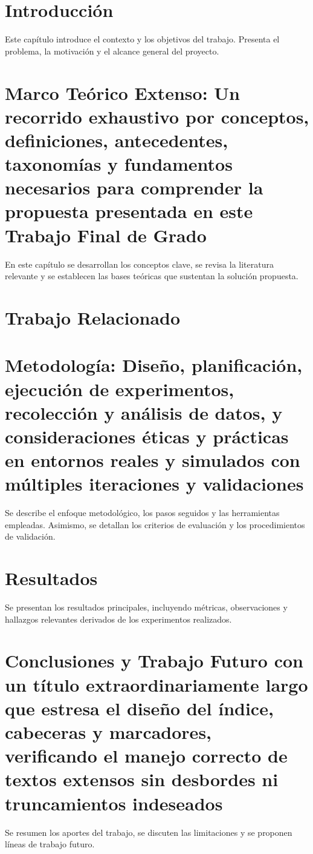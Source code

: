 
\chapter{Introducción}
Este capítulo introduce el contexto y los objetivos del trabajo. Presenta el problema, la motivación y el alcance general del proyecto.

\chapter[Marco Teórico]{Marco Teórico Extenso: Un recorrido exhaustivo por conceptos, definiciones, antecedentes, taxonomías y fundamentos necesarios para comprender la propuesta presentada en este Trabajo Final de Grado}
En este capítulo se desarrollan los conceptos clave, se revisa la literatura relevante y se establecen las bases teóricas que sustentan la solución propuesta.

\chapter{Trabajo Relacionado}

\chapter[Metodología]{Metodología: Diseño, planificación, ejecución de experimentos, recolección y análisis de datos, y consideraciones éticas y prácticas en entornos reales y simulados con múltiples iteraciones y validaciones}
Se describe el enfoque metodológico, los pasos seguidos y las herramientas empleadas. Asimismo, se detallan los criterios de evaluación y los procedimientos de validación.

\chapter{Resultados}
Se presentan los resultados principales, incluyendo métricas, observaciones y hallazgos relevantes derivados de los experimentos realizados.

\chapter[Conclusiones]{Conclusiones y Trabajo Futuro con un título extraordinariamente largo que estresa el diseño del índice, cabeceras y marcadores, verificando el manejo correcto de textos extensos sin desbordes ni truncamientos indeseados}
Se resumen los aportes del trabajo, se discuten las limitaciones y se proponen líneas de trabajo futuro.

